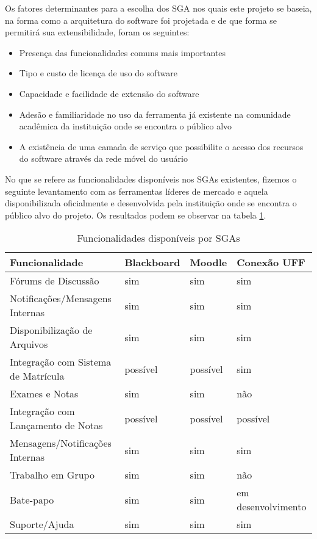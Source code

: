 Os fatores determinantes para a escolha dos SGA nos quais este projeto se baseia, na forma como a arquitetura do software foi projetada e de que forma se permitirá sua extensibilidade, foram os seguintes:
\begin{itemize}
    \item Presença das funcionalidades comuns mais importantes
    \item Tipo e custo de licença de uso do software
    \item Capacidade e facilidade de extensão do software
    \item Adesão e familiaridade no uso da ferramenta já existente na comunidade acadêmica da instituição onde se encontra o público alvo
    \item A existência de uma camada de serviço que possibilite o acesso dos recursos do software através da rede móvel do usuário 
\end{itemize}

No que se refere as funcionalidades disponíveis nos SGAs existentes, fizemos o seguinte levantamento com as ferramentas líderes de mercado e aquela disponibilizada oficialmente e desenvolvida pela instituição onde se encontra o público alvo do projeto. Os resultados podem se observar na tabela \ref{funcs_sga}.

\begin{table}[H]
\centering
\caption{Funcionalidades disponíveis por SGAs}
\label{funcs_sga}
\begin{tabular}{@{}llll@{}}
\toprule
Funcionalidade & Blackboard & Moodle & Conexão UFF \\ \midrule
Fórums de Discussão & sim & sim & sim \\
Notificações/Mensagens Internas & sim & sim & sim \\
Disponibilização de Arquivos & sim & sim & sim \\
Integração com Sistema de Matrícula & possível & possível & sim \\
Exames e Notas & sim & sim & não \\
Integração com Lançamento de Notas & possível & possível & possível \\
Mensagens/Notificações Internas & sim & sim & sim \\
Trabalho em Grupo & sim & sim & não \\
Bate-papo & sim & sim & em desenvolvimento \\
Suporte/Ajuda & sim & sim & sim \\ \bottomrule
\end{tabular}
\end{table}

